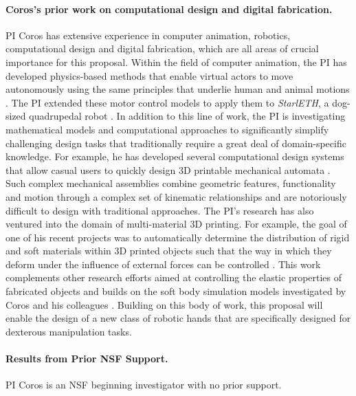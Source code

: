\paragraph{Coros's prior work on computational design and digital fabrication.} PI Coros has extensive experience in computer animation, robotics, computational design and digital fabrication, which are all areas of crucial importance for this proposal. Within the field of computer animation, the PI has developed physics-based methods that enable virtual actors to move autonomously using the same principles that underlie human and animal motions \cite{Yin08,Coros08,Coros09,Coros2010,Coros2011}. The PI extended these motor control models to apply them to \emph{StarlETH}, a dog-sized quadrupedal robot \cite{Gehring2015,Gehring2014,Gehring2013}. In addition to this line of work, the PI is investigating mathematical models and computational approaches to significantly simplify challenging design tasks that traditionally require a great deal of domain-specific knowledge. For example, he has developed several computational design systems that allow casual users to quickly design 3D printable mechanical automata \cite{Coros2013,Thomaszewski14CDL,Megaro14Chacra,Bacher2015}. Such complex mechanical assemblies combine geometric features, functionality and motion through a complex set of kinematic relationships and are notoriously difficult to design with traditional approaches. The PI's research has also ventured into the domain of multi-material 3D printing. For example, the goal of one of his recent projects was to automatically determine the distribution of rigid and soft materials within 3D printed objects such that the way in which they deform under the influence of external forces can be controlled \cite{Skouras2013}. This work complements other research efforts aimed at controlling the elastic properties of fabricated objects \cite{Gauge2014,Jesus2015} and builds on the soft body simulation models investigated by Coros and his colleagues \cite{Coros2012,Hahn2012,Schumacher2012}. Building on this body of work, this proposal will enable the design of a new class of robotic hands that are specifically designed for dexterous manipulation tasks.

\paragraph{Results from Prior NSF Support.} PI Coros is an NSF beginning investigator with no prior support.

